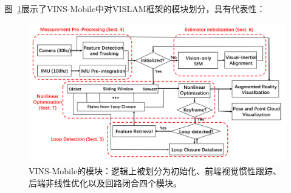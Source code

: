 图~\ref{fig:vins_model}展示了VINS-Mobile中对VISLAM框架的模块划分，具有代表性：

\begin{figure}[htb!]
    \centering
    \includegraphics[width=\textwidth]{Pictures/vins_model.png}
    \caption{VINS-Mobile\citep{li2017monocular}的模块：逻辑上被划分为初始化、前端视觉惯性跟踪、后端非线性优化以及回路闭合四个模块。}
    \label{fig:vins_model}
\end{figure}
